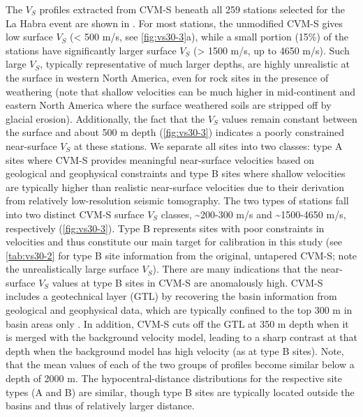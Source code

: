 The $V_S$ profiles extracted from CVM-S beneath all 259 stations selected for the La Habra event are shown in . For most stations, the unmodified CVM-S gives low surface $V_S$ (< 500 m/s, see \cref{fig:vs30-3}a), while a small portion (15\%) of the stations have significantly larger surface $V_S$ (> 1500 m/s, up to 4650 m/s). Such large $V_S$, typically representative of much larger depths, are highly unrealistic at the surface in western North America, even for rock sites in the presence of weathering (note that shallow velocities can be much higher in mid-continent and eastern North America where the surface weathered soils are stripped off by glacial erosion). Additionally, the fact that the $V_S$ values remain constant between the surface and about 500 m depth (\cref{fig:vs30-3}) indicates a poorly constrained near-surface $V_S$ at these stations. We separate all sites into two classes: type A sites where CVM-S provides meaningful near-surface velocities based on geological and geophysical constraints and type B sites where shallow velocities are typically higher than realistic near-surface velocities due to their derivation from relatively low-resolution seismic tomography. The two types of stations fall into two distinct CVM-S surface $V_S$ classes, \textasciitilde 200-300 m/s and \textasciitilde 1500-4650 m/s, respectively (\cref{fig:vs30-3}). Type B represents sites with poor constraints in velocities and thus constitute our main target for calibration in this study (see \cref{tab:vs30-2} for type B site information from the original, untapered CVM-S; note the unrealistically large surface $V_S$). There are many indications that the near-surface $V_S$ values at type B sites in CVM-S are anomalously high. CVM-S includes a geotechnical layer (GTL) by recovering the basin information from geological and geophysical data, which are typically confined to the top 300 m in basin areas only \citep{magistraleGeologybased3DVelocity1996,magistraleSCECSouthernCalifornia2000}. In addition, CVM-S cuts off the GTL at 350 m depth when it is merged with the background velocity model, leading to a sharp contrast at that depth when the background model has high velocity (as at type B sites). Note, that the mean values of each of the two groups of profiles become similar below a depth of 2000 m. The hypocentral-distance distributions for the respective site types (A and B) are similar, though type B sites are typically located outside the basins and thus of relatively larger distance.

